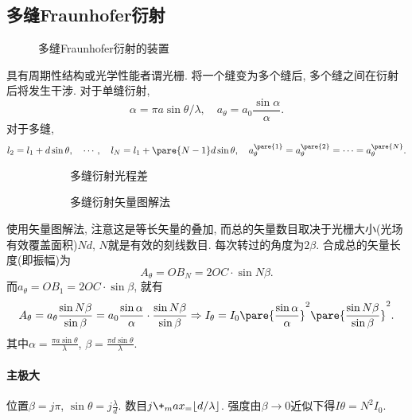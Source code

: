 \documentclass{ctexart}
\begin{document}


\subsection{多缝Fraunhofer衍射} %
\label{sub:多缝fraunhofer衍射}

\begin{figure}[ht]
    \centering
    \caption{多缝Fraunhofer衍射的装置}
\end{figure}
具有周期性结构或光学性能者谓光栅. 将一个缝变为多个缝后, 多个缝之间在衍射后将发生干涉. 对于单缝衍射,
\[ \alpha = \pi a \sin \theta / \lambda,\quad a_{\theta} = a_0 \frac{\sin\alpha}{\alpha}. \]
对于多缝,
\[ l_2 = l_1 + d\sin\theta,\quad \cdots,\quad l_N = l_1 + \pare{N-1} d\sin\theta,\quad a_\theta^{\pare{1}} = a_\theta^{\pare{2}} = \cdots = a_\theta^{\pare{N}}. \]
\begin{figure}[ht]
    \centering
    \begin{subfigure}[b]{6cm}
        \centering
        \caption{多缝衍射光程差}
    \end{subfigure}
    \begin{subfigure}[b]{6cm}
        \centering
        \caption{多缝衍射矢量图解法}
    \end{subfigure}
    \caption{}
\end{figure}
使用矢量图解法, 注意这是等长矢量的叠加, 而总的矢量数目取决于光栅大小(光场有效覆盖面积)$Nd$, $N$就是有效的刻线数目. 每次转过的角度为$2\beta$. 合成总的矢量长度(即振幅)为
\[ A_\theta = OB_N = 2 OC\cdot \sin N\beta. \]
而$a_\theta = OB_1 = 2OC\cdot \sin \beta$, 就有
\[ A_\theta = a_\theta \frac{\sin N\beta}{\sin \beta} = a_0 \frac{\sin\alpha}{\alpha} \cdot \frac{\sin N\beta}{\sin\beta} \Rightarrow I_\theta = I_0 \pare{\frac{\sin\alpha}{\alpha}}^2 \pare{\frac{\sin N\beta}{\sin\beta}}^2. \]
其中$\alpha = \displaystyle \frac{\pi a\sin\theta}{\lambda}$, $\beta = \displaystyle \frac{\pi d\sin\theta}{\lambda}$.

\paragraph{主极大} %
\label{par:主极大}

位置$\beta = j\pi$, $\displaystyle \sin\theta = j \frac{\lambda}{d}$. 数目$j\+_max_ = \lfloor d/\lambda \rfloor$. 强度由$\beta\rightarrow 0$近似下得$I\theta = N^2 I_0$.
\end{document}
